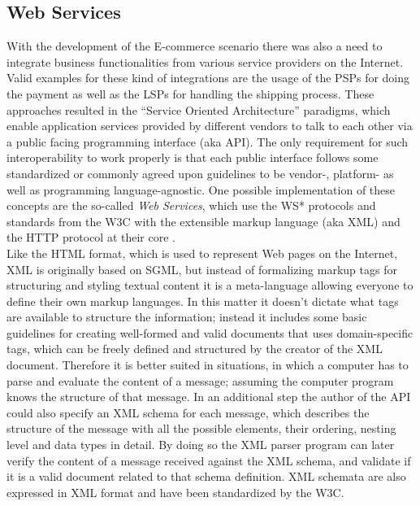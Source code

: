 
\subsection{Web Services}
\label{subsec:web_services}

With the development of the \gls{E-commerce} scenario there was also a need to integrate business functionalities from various service providers on the Internet. Valid examples for these kind of integrations are the usage of the \gls{PSP}s for doing the payment as well as the \gls{LSP}s for handling the shipping process. These approaches resulted in the ``Service Oriented Architecture'' paradigms, which enable application services provided by different vendors to talk to each other via a public facing programming interface (aka \gls{API}). The only requirement for such interoperability to work properly is that each public interface follows some standardized or commonly agreed upon guidelines to be vendor-, platform- as well as programming language-agnostic. One possible implementation of these concepts are the so-called \emph{Web Services}, which use the WS* protocols and standards from the \gls{W3C} with the extensible markup language (aka \gls{XML}) and the \gls{HTTP} protocol at their core \citep{josuttis2007soa}. \\

Like the \gls{HTML} format, which is used to represent Web pages on the Internet, \gls{XML} is originally based on \gls{SGML}, but instead of formalizing markup tags for structuring and styling textual content it is a meta-language allowing everyone to define their own markup languages. In this matter it doesn’t dictate what tags are available to structure the information; instead it includes some basic guidelines for creating well-formed and valid documents that uses domain-specific tags, which can be freely defined and structured by the creator of the \gls{XML} document. Therefore it is better suited in situations, in which a computer has to parse and evaluate the content of a message; assuming the computer program knows the structure of that message. In an additional step the author of the \gls{API} could also specify an \gls{XML} schema for each message, which describes the structure of the message with all the possible elements, their ordering, nesting level and data types in detail. By doing so the \gls{XML} parser program can later verify the content of a message received against the \gls{XML} schema, and validate if it is a valid document related to that schema definition. \gls{XML} schemata are also expressed in \gls{XML} format and have been standardized by the \gls{W3C}. \\

